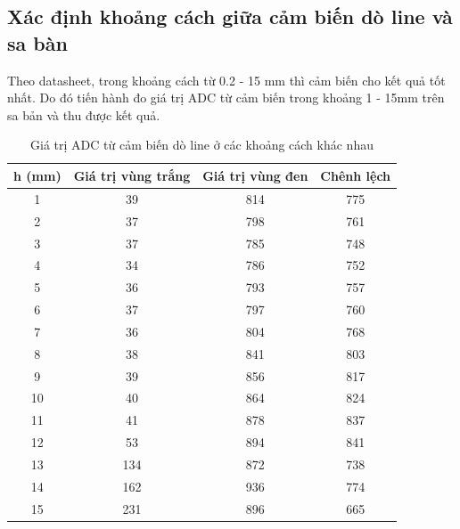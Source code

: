         \subsection{Xác định khoảng cách giữa cảm biến dò line và sa bàn}
            \hspace*{0.6cm}Theo datasheet, trong khoảng cách từ 0.2 - 15 mm thì cảm biến cho kết quả tốt nhất. Do đó tiến hành đo giá trị ADC từ cảm biến trong khoảng 1 - 15mm trên sa bản và thu được kết quả.
            \begin{table}[H]
                \centering
                \caption{Giá trị ADC từ cảm biến dò line ở các khoảng cách khác nhau}
                \label{tab:4-2}
                \begin{tabular}{|c|c|c|c|}
                    \hline
                    \textbf{h (mm)} & \textbf{Giá trị vùng trắng} & \textbf{Giá trị vùng đen} & \textbf{Chênh lệch} \\
                    \hline
                    1 & 39 & 814 & 775 \\
                    \hline
                    2 & 37 & 798 & 761 \\
                    \hline
                    3 & 37 & 785 & 748 \\
                    \hline
                    4 & 34 & 786 & 752 \\
                    \hline
                    5 & 36 & 793 & 757 \\
                    \hline
                    6 & 37 & 797 & 760 \\
                    \hline
                    7 & 36 & 804 & 768 \\
                    \hline
                    \rowcolor{yellow!50}
                    8 & 38 & 841 & 803 \\
                    \hline
                    \rowcolor{yellow!50}
                    9 & 39 & 856 & 817 \\
                    \hline
                    \rowcolor{yellow!50}
                    10 & 40 & 864 & 824 \\
                    \hline
                    \rowcolor{yellow!50}
                    11 & 41 & 878 & 837 \\
                    \hline
                    \rowcolor{yellow!50}
                    12 & 53 & 894 & 841 \\
                    \hline
                    13 & 134 & 872 & 738 \\
                    \hline
                    14 & 162 & 936 & 774 \\
                    \hline
                    15 & 231 & 896 & 665 \\
                    \hline
                \end{tabular}
            \end{table}
